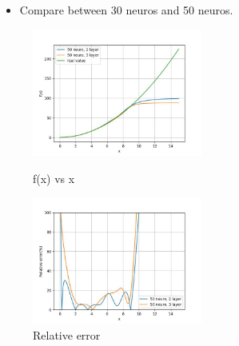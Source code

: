 \documentclass{beamer}
\begin{document}
\begin{frame}
    \frametitle{\secname}
    \begin{itemize}
        \item Compare between 30 neuros and 50 neuros.
    \end{itemize}

    \begin{figure}
        \begin{multicols}{2}
            \includegraphics[width=2.2in]{Figs/Value_layer_compare.jpg}
            \caption{f(x) vs x}
            \columnbreak

            \includegraphics[width=2.2in]{Figs/Error_layer_compare.jpg}
            \caption{Relative error}
        \end{multicols}
    \end{figure}
\end{frame}
\end{document}
